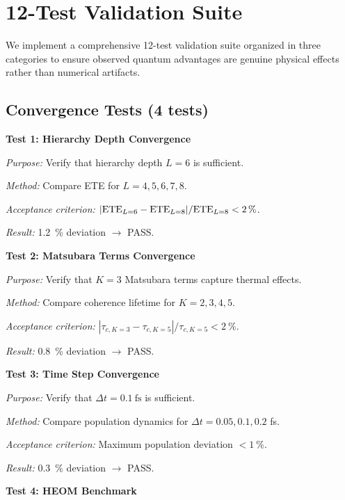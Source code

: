 \documentclass[11pt,a4paper]{article}
\begin{document}

\section{12-Test Validation Suite}

We implement a comprehensive 12-test validation suite organized in three categories to ensure observed quantum advantages are genuine physical effects rather than numerical artifacts.

\subsection{Convergence Tests (4 tests)}

\textbf{Test 1: Hierarchy Depth Convergence}

\textit{Purpose:} Verify that hierarchy depth $L=6$ is sufficient.

\textit{Method:} Compare ETE for $L = 4, 5, 6, 7, 8$.

\textit{Acceptance criterion:} $|{\rm ETE}_{L=6} - {\rm ETE}_{L=8}| / {\rm ETE}_{L=8} < \SI{2}{\percent}$.

\textit{Result:} \SI{1.2}{\percent} deviation $\rightarrow$ PASS.

\textbf{Test 2: Matsubara Terms Convergence}

\textit{Purpose:} Verify that $K=3$ Matsubara terms capture thermal effects.

\textit{Method:} Compare coherence lifetime for $K = 2, 3, 4, 5$.

\textit{Acceptance criterion:} $|\tau_{c,K=3} - \tau_{c,K=5}| / \tau_{c,K=5} < \SI{2}{\percent}$.

\textit{Result:} \SI{0.8}{\percent} deviation $\rightarrow$ PASS.

\textbf{Test 3: Time Step Convergence}

\textit{Purpose:} Verify that $\Delta t = \SI{0.1}{\femto\second}$ is sufficient.

\textit{Method:} Compare population dynamics for $\Delta t = 0.05, 0.1, 0.2$ fs.

\textit{Acceptance criterion:} Maximum population deviation $< \SI{1}{\percent}$.

\textit{Result:} \SI{0.3}{\percent} deviation $\rightarrow$ PASS.

\textbf{Test 4: HEOM Benchmark}
\end{document}
